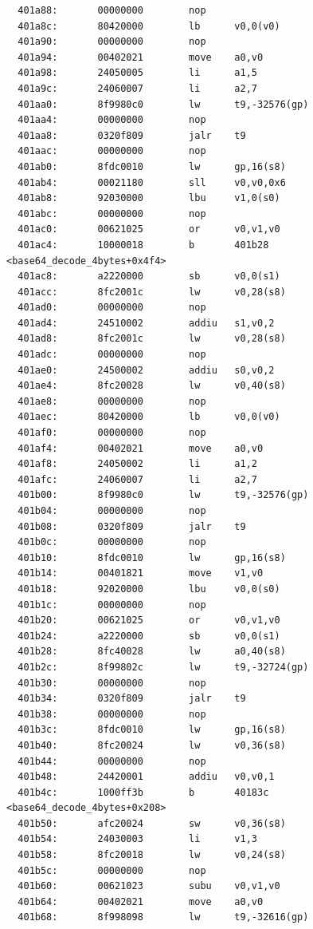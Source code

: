\documentclass[11pt]{article}
\begin{document}
\begin{verbatim}
  401a88:       00000000        nop
  401a8c:       80420000        lb      v0,0(v0)
  401a90:       00000000        nop
  401a94:       00402021        move    a0,v0
  401a98:       24050005        li      a1,5
  401a9c:       24060007        li      a2,7
  401aa0:       8f9980c0        lw      t9,-32576(gp)
  401aa4:       00000000        nop
  401aa8:       0320f809        jalr    t9
  401aac:       00000000        nop
  401ab0:       8fdc0010        lw      gp,16(s8)
  401ab4:       00021180        sll     v0,v0,0x6
  401ab8:       92030000        lbu     v1,0(s0)
  401abc:       00000000        nop
  401ac0:       00621025        or      v0,v1,v0
  401ac4:       10000018        b       401b28 <base64_decode_4bytes+0x4f4>
  401ac8:       a2220000        sb      v0,0(s1)
  401acc:       8fc2001c        lw      v0,28(s8)
  401ad0:       00000000        nop
  401ad4:       24510002        addiu   s1,v0,2
  401ad8:       8fc2001c        lw      v0,28(s8)
  401adc:       00000000        nop
  401ae0:       24500002        addiu   s0,v0,2
  401ae4:       8fc20028        lw      v0,40(s8)
  401ae8:       00000000        nop
  401aec:       80420000        lb      v0,0(v0)
  401af0:       00000000        nop
  401af4:       00402021        move    a0,v0
  401af8:       24050002        li      a1,2
  401afc:       24060007        li      a2,7
  401b00:       8f9980c0        lw      t9,-32576(gp)
  401b04:       00000000        nop
  401b08:       0320f809        jalr    t9
  401b0c:       00000000        nop
  401b10:       8fdc0010        lw      gp,16(s8)
  401b14:       00401821        move    v1,v0
  401b18:       92020000        lbu     v0,0(s0)
  401b1c:       00000000        nop
  401b20:       00621025        or      v0,v1,v0
  401b24:       a2220000        sb      v0,0(s1)
  401b28:       8fc40028        lw      a0,40(s8)
  401b2c:       8f99802c        lw      t9,-32724(gp)
  401b30:       00000000        nop
  401b34:       0320f809        jalr    t9
  401b38:       00000000        nop
  401b3c:       8fdc0010        lw      gp,16(s8)
  401b40:       8fc20024        lw      v0,36(s8)
  401b44:       00000000        nop
  401b48:       24420001        addiu   v0,v0,1
  401b4c:       1000ff3b        b       40183c <base64_decode_4bytes+0x208>
  401b50:       afc20024        sw      v0,36(s8)
  401b54:       24030003        li      v1,3
  401b58:       8fc20018        lw      v0,24(s8)
  401b5c:       00000000        nop
  401b60:       00621023        subu    v0,v1,v0
  401b64:       00402021        move    a0,v0
  401b68:       8f998098        lw      t9,-32616(gp)

\end{verbatim}
\end{document}
